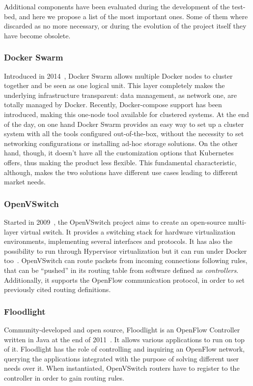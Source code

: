 Additional components have been evaluated during the development of the 
test-bed, and here we propose a list of the most important ones. Some of them 
where discarded as no more necessary, or during the evolution of the project 
itself they have become obsolete.

\subsubsection{Docker Swarm}
\label{chap:prjan:sec:tech:sub:other:sub:swarm}
Introduced in 2014~\cite{swarmGit}, Docker Swarm allows multiple Docker nodes to
cluster together and be seen as one logical unit. This layer completely makes
the underlying infrastructure transparent: data management, as network one, are
totally managed by Docker. Recently, Docker-compose support has been introduced,
making this one-node tool available for clustered systems. At the end of the
day, on one hand Docker Swarm provides an easy way to set up a cluster system
with all the tools configured out-of-the-box, without the necessity to set
networking configurations or installing ad-hoc storage solutions. On the other
hand, though, it doesn't have all the customization options that Kubernetes
offers, thus making the product less flexible. This fundamental characteristic,
although, makes the two solutions have different use cases leading to different
market needs.

\subsubsection{OpenVSwitch}
Started in 2009~\cite{ovsGit}, the OpenVSwitch project aims to create an
open-source multi-layer virtual switch. It provides a switching stack for
hardware virtualization environments, implementing several interfaces and
protocols. It has also the possibility to run through Hypervisor virtualization
but it can run under Docker too~\cite{ovsDocker}. OpenVSwitch can route packets
from incoming connections following rules, that can be ``pushed'' in its routing
table from software defined as \textit{controllers}. Additionally, it supports
the OpenFlow communication protocol, in order to set previously cited routing
definitions.

\subsubsection{Floodlight}
\label{chap:prjan:sec:tech:sub:other:sub:floodlight}
Community-developed and open source, Floodlight is an OpenFlow Controller
written in Java at the end of 2011~\cite{floodlightGit}. It allows various
applications to run on top of it. Floodlight has the role of controlling and
inquiring an OpenFlow network, querying the applications integrated with the
purpose of solving different user needs over it. When instantiated, OpenVSwitch
routers have to register to the controller in order to gain routing rules.


